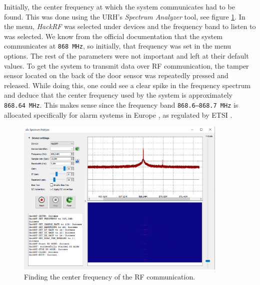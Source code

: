 Initially, the center frequency at which the system communicates had to be found. This was done using the URH's \textit{Spectrum Analyzer} tool, see figure \ref{fig:finding-center-freq}. In the menu, \textit{HackRF} was selected under devices and the frequency band to listen to was selected. We know from the official documentation that the system communicates at \texttt{868 MHz}, so initially, that frequency was set in the menu options. The rest of the parameters were not important and left at their default values. To get the system to transmit data over RF communication, the tamper sensor located on the back of the door sensor was repeatedly pressed and released. While doing this, one could see a clear spike in the frequency spectrum and deduce that the center frequency used by the system is approximately \texttt{868.64 MHz}. This makes sense since the frequency band \texttt{868.6–868.7 MHz} is allocated specifically for alarm systems in Europe \cite{etsi-srd-regulation}, as regulated by ETSI .
\begin{figure}[!ht]
    \centering
    \includegraphics[width=0.9\textwidth]{images/6-pentesting/find-frequency.png}
    \caption{Finding the center frequency of the RF communication.}
    \label{fig:finding-center-freq}
\end{figure}

